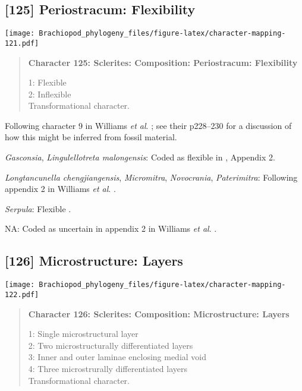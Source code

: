 \documentclass[openany]{book}
\theoremstyle{definition}
\theoremstyle{definition}
\theoremstyle{definition}
\theoremstyle{remark}
\begin{document}
\subsection*{{[}125{]} Periostracum:
Flexibility}\label{periostracum-flexibility}

\texttt{[image: Brachiopod\_phylogeny\_files/figure-latex/character-mapping-121.pdf]}

\begin{quote}
\textbf{Character 125: Sclerites: Composition: Periostracum:
Flexibility}

1: Flexible\\
2: Inflexible\\
Transformational character.
\end{quote}

Following character 9 in Williams \emph{et al}.
\citeyearpar{Williams1998Thediversity}; see their p228--230 for a
discussion of how this might be inferred from fossil material.

\hypertarget{Gasconsia-coding-125}{}
\emph{Gasconsia}, \emph{Lingulellotreta malongensis}: Coded as flexible
in \citet{Williams1998Thediversity}, Appendix 2.

\hypertarget{Longtancunella_chengjiangensis-coding-125}{}
\emph{Longtancunella chengjiangensis}, \emph{Micromitra},
\emph{Novocrania}, \emph{Paterimitra}: Following appendix 2 in Williams
\emph{et al}. \citeyearpar{Williams1998Thediversity}.

\hypertarget{Serpula-coding-125}{}
\emph{Serpula}: Flexible \citep{Williams1998Thediversity}.

\hypertarget{NA-coding-125}{}
NA: Coded as uncertain in appendix 2 in Williams \emph{et al}.
\citeyearpar{Williams1998Thediversity}.

\subsection*{{[}126{]} Microstructure:
Layers}\label{microstructure-layers}

\texttt{[image: Brachiopod\_phylogeny\_files/figure-latex/character-mapping-122.pdf]}

\begin{quote}
\textbf{Character 126: Sclerites: Composition: Microstructure: Layers}

1: Single microstructural layer\\
2: Two microstructurally differentiated layers\\
3: Inner and outer laminae enclosing medial void\\
4: Three microstrurally differentiated layers\\
Transformational character.
\end{quote}
\end{document}
